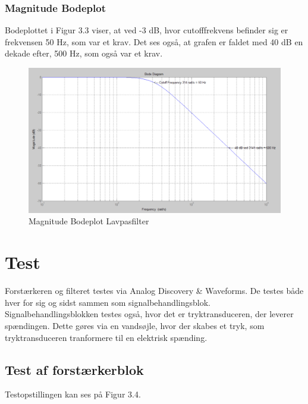 \subsubsection{Magnitude Bodeplot}
Bodeplottet i Figur 3.3 viser, at ved -3 dB, hvor cutofffrekvens befinder sig er frekvensen 50 Hz, som var et krav. Det ses også, at grafen er faldet med 40 dB en dekade efter, 500 Hz, som også var et krav.   
\begin{figure}[H]
	\centering
	\includegraphics[width=1\textwidth]{Figurer/Bodeplot_Lavpasfilter_Teoretisk}
	\caption{Magnitude Bodeplot Lavpasfilter}
	\label{fig:Bodeplot}
\end{figure}

\section{Test}
Forstærkeren og filteret testes via Analog Discovery \& Waveforms. De testes både hver for sig og sidst sammen som signalbehandlingsblok.\\
Signalbehandlingsblokken testes også, hvor det er tryktransduceren, der leverer spændingen. Dette gøres via en vandsøjle, hvor der skabes et tryk, som tryktransduceren tranformere til en elektrisk spænding.  

\subsection{Test af forstærkerblok}
Testopstillingen kan ses på Figur 3.4. 

